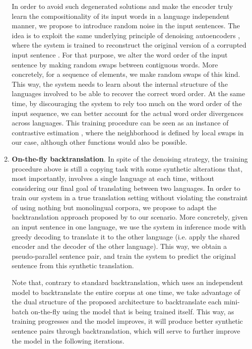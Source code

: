 \documentclass{article} \usepackage{iclr2018_conference,times}
\begin{document}
\begin{enumerate}
In order to avoid such degenerated solutions and make the encoder truly learn the compositionality of its input words in a language independent manner, we propose to introduce random noise in the input sentences. The idea is to exploit the same underlying principle of denoising autoencoders \citep{vincent2010stacked}, where the system is trained to reconstruct the original version of a corrupted input sentence \citep{dai2015semisupervised,hill2016learning}. For that purpose, we alter the word order of the input sentence by making random swaps between contiguous words. More concretely, for a sequence of  elements, we make  random swaps of this kind. This way, the system needs to learn about the internal structure of the languages involved to be able to recover the correct word order. At the same time, by discouraging the system to rely too much on the word order of the input sequence, we can better account for the actual word order divergences across languages. This training procedure can be seen as an instance of contrastive estimation \citep{smith2005contrastive}, where the neighborhood is defined by local swaps in our case, although other functions would also be possible.

\item \textbf{On-the-fly backtranslation}. In spite of the denoising strategy, the training procedure above is still a copying task with some synthetic alterations that, most importantly, involves a single language at each time, without considering our final goal of translating between two languages. In order to train our system in a true translation setting without violating the constraint of using nothing but monolingual corpora, we propose to adapt the backtranslation approach proposed by \citet{sennrich2016improving} to our scenario. More concretely, given an input sentence in one language, we use the system in inference mode with greedy decoding to translate it to the other language (i.e. apply the shared encoder and the decoder of the other language). This way, we obtain a pseudo-parallel sentence pair, and train the system to predict the original sentence from this synthetic translation.

Note that, contrary to standard backtranslation, which uses an independent model to backtranslate the entire corpus at one time, we take advantage of the dual structure of the proposed architecture to backtranslate each mini-batch on-the-fly using the model that is being trained itself. This way, as training progresses and the model improves, it will produce better synthetic sentence pairs through backtranslation, which will serve to further improve the model in the following iterations.
\end{enumerate}
\end{document}
